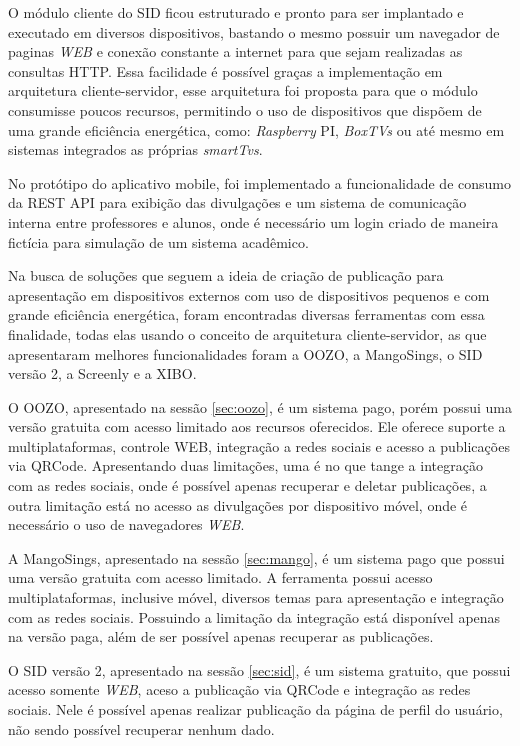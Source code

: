 O módulo cliente do SID ficou estruturado e pronto para ser implantado e executado em diversos dispositivos, bastando o mesmo possuir um navegador de paginas \textit{WEB} e conexão constante a internet para que sejam realizadas as consultas HTTP. Essa facilidade é possível graças a implementação em arquitetura cliente-servidor, esse arquitetura foi proposta para que o módulo consumisse poucos recursos, permitindo o uso de dispositivos que dispõem de uma grande eficiência energética, como: \textit{Raspberry} PI, \textit{BoxTVs} ou até mesmo em sistemas integrados as próprias \textit{smartTvs}.

No protótipo do aplicativo mobile, foi implementado a funcionalidade de consumo da REST API para exibição das divulgações e um sistema de comunicação interna entre professores e alunos, onde é necessário um login criado de maneira fictícia para simulação de um sistema acadêmico.

Na busca de soluções que seguem a ideia de criação de publicação para apresentação em dispositivos externos com uso de dispositivos pequenos e com grande eficiência energética, foram encontradas diversas ferramentas com essa finalidade, todas elas usando o conceito de arquitetura cliente-servidor, as que apresentaram melhores funcionalidades foram a OOZO, a MangoSings, o SID versão 2, a Screenly e a XIBO.

O OOZO, apresentado na sessão \ref{sec:oozo}, é um sistema pago, porém possui uma versão gratuita com acesso limitado aos recursos oferecidos. Ele oferece suporte a multiplataformas, controle WEB, integração a redes sociais e acesso a publicações via QRCode. Apresentando duas limitações, uma é no que tange a integração com as redes sociais, onde é possível apenas recuperar e deletar publicações, a outra limitação está no acesso as divulgações por dispositivo móvel, onde é necessário o uso de navegadores \textit{WEB}. 

A MangoSings, apresentado na sessão \ref{sec:mango}, é um sistema pago que possui uma versão gratuita com acesso limitado. A ferramenta possui acesso multiplataformas, inclusive móvel, diversos temas para apresentação e integração com as redes sociais. Possuindo a limitação da integração está disponível apenas na versão paga, além de ser possível apenas recuperar as publicações.

O SID versão 2, apresentado na sessão \ref{sec:sid}, é um sistema gratuito, que possui acesso somente \textit{WEB}, aceso a publicação via QRCode e integração as redes sociais. Nele é possível apenas realizar publicação da página de perfil do usuário, não sendo possível recuperar nenhum dado.

